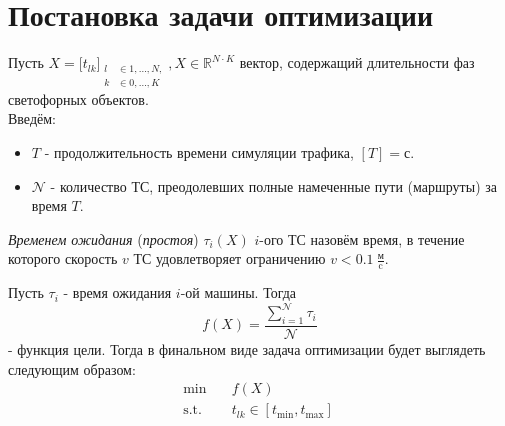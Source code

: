 \section{Постановка задачи оптимизации}
Пусть $X = \biggr[t_{lk}\biggl]_{\begin{aligned}
		\scriptstyle l & \scriptstyle \in 1,\ldots, N,\\
		\scriptstyle k & \scriptstyle \in 0, \ldots, K
\end{aligned}}, X \in \mathbb{R}^{N\cdot K}$ вектор, содержащий длительности фаз светофорных объектов.\\
\newpage
Введём:
\begin{itemize}
	\item $T$ - продолжительность времени симуляции трафика, $[T] = \text{с}$.
	\item $\mathcal{N}$ - количество ТС, преодолевших полные намеченные пути (маршруты) за время $T$.
\end{itemize}
\begin{m-definition}
	\textit{Временем ожидания} (\textit{простоя}) $\tau_i(X)$ $i$-ого ТС назовём время, в течение которого скорость $v$ ТС удовлетворяет ограничению $v < 0.1 \ \frac{\text{м}}{\text{c}}$.\\
\end{m-definition}
Пусть $\tau_i$ - время ожидания $i$-ой машины. Тогда
\begin{equation}
	\displaystyle f(X) = \frac{\sum\limits_{i = 1}^{\mathcal{N}}\tau_i}{\mathcal{N}}
\end{equation} - функция цели.
Тогда в финальном виде задача оптимизации будет выглядеть следующим образом:
\begin{equation}
	\label{eq:goal-function}
	\begin{aligned}
		\min \quad & f(X) \\
		\text{s.t.} \quad & t_{lk} \in [t_{\min}, t_{\max}]\
	\end{aligned}	
\end{equation}


%
